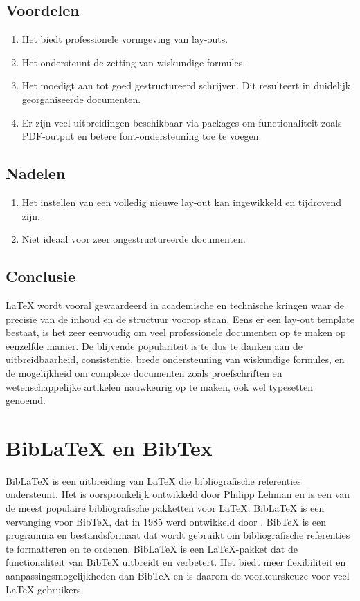 \subsection{Voordelen}
\begin{enumerate}
    \item Het biedt professionele vormgeving van lay-outs.
    \item Het ondersteunt de zetting van wiskundige formules.
    \item Het moedigt aan tot goed gestructureerd schrijven. Dit resulteert in duidelijk georganiseerde documenten.
    \item Er zijn veel uitbreidingen beschikbaar via packages om functionaliteit zoals PDF-output en betere font-ondersteuning toe te voegen.
\end{enumerate}

\subsection{Nadelen}
\begin{enumerate}
    \item Het instellen van een volledig nieuwe lay-out kan ingewikkeld en tijdrovend zijn.
    \item Niet ideaal voor zeer ongestructureerde documenten.
\end{enumerate}

\subsection{Conclusie}
LaTeX \autocite{Oetiker2023} wordt vooral gewaardeerd in academische en technische kringen waar de precisie van de inhoud en de structuur voorop staan. Eens er een lay-out template bestaat, is het zeer eenvoudig om veel professionele documenten op te maken op eenzelfde manier. 
De blijvende populariteit is te dus te danken aan de uitbreidbaarheid, consistentie, brede ondersteuning van wiskundige formules, en de mogelijkheid om complexe documenten zoals proefschriften en wetenschappelijke artikelen nauwkeurig op te maken, ook wel typesetten genoemd. 
 
\section{BibLaTeX en BibTex}
BibLaTeX is een uitbreiding van LaTeX die bibliografische referenties ondersteunt. Het is oorspronkelijk ontwikkeld door Philipp Lehman \autocite{Kime2024} en is een van de meest populaire bibliografische pakketten voor LaTeX. BibLaTeX is een vervanging voor BibTeX, dat in 1985 werd ontwikkeld door \textcite{Patashnik1988}. BibTeX is een programma en bestandsformaat dat wordt gebruikt om bibliografische referenties te formatteren en te ordenen. BibLaTeX is een LaTeX-pakket dat de functionaliteit van BibTeX uitbreidt en verbetert. Het biedt meer flexibiliteit en aanpassingsmogelijkheden dan BibTeX en is daarom de voorkeurskeuze voor veel LaTeX-gebruikers.

